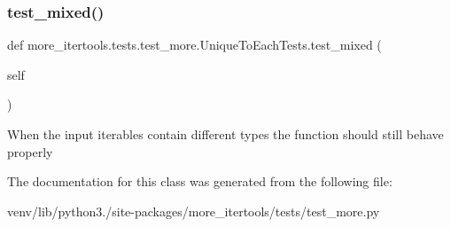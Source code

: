 \subsubsection{\texorpdfstring{test\+\_\+mixed()}{test\_mixed()}}
{\footnotesize\ttfamily def more\+\_\+itertools.\+tests.\+test\+\_\+more.\+Unique\+To\+Each\+Tests.\+test\+\_\+mixed (\begin{DoxyParamCaption}\item[{}]{self }\end{DoxyParamCaption})}

\begin{DoxyVerb}When the input iterables contain different types the function should
still behave properly\end{DoxyVerb}
 

The documentation for this class was generated from the following file\+:\begin{DoxyCompactItemize}
\item 
venv/lib/python3./site-\/packages/more\+\_\+itertools/tests/test\+\_\+more.\+py\end{DoxyCompactItemize}
